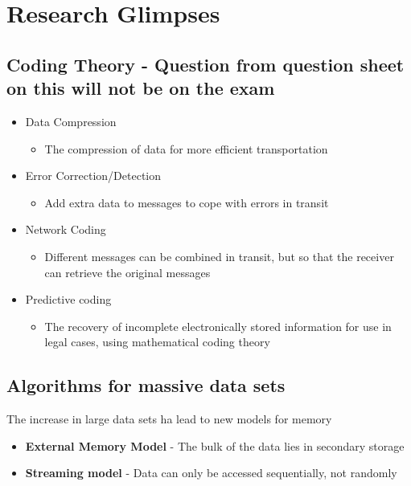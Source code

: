 \documentclass{article}[18pt]
\begin{document}
\section{Research Glimpses}
\subsection{Coding Theory - Question from question sheet on this will not be on the exam}
\begin{itemize}
	\item Data Compression
	\begin{itemize}
		\item The compression of data for more efficient transportation
	\end{itemize}
	\item Error Correction/Detection
	\begin{itemize}
		\item Add extra data to messages to cope with errors in transit
	\end{itemize}
	\item Network Coding
	\begin{itemize}
		\item Different messages can be combined in transit, but so that the receiver can retrieve the original messages
	\end{itemize}
	\item Predictive coding
	\begin{itemize}
		\item The recovery of incomplete electronically stored information for use in legal cases, using mathematical coding theory
	\end{itemize}
\end{itemize}
\subsection{Algorithms for massive data sets}
The increase in large data sets ha lead to new models for memory
\begin{itemize}
	\item \textbf{External Memory Model} - The bulk of the data lies in secondary storage
	\item \textbf{Streaming model} - Data can only be accessed sequentially, not randomly 
\end{itemize}
\end{document}

